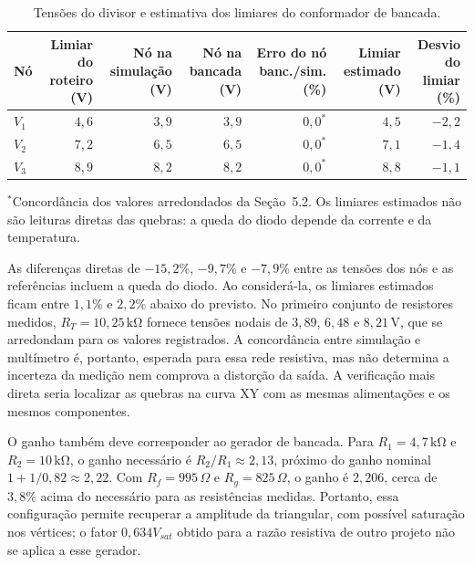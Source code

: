 \documentclass[11pt,a4paper]{article}
\begin{document}
\begin{table}[H]
\centering
\caption{Tensões do divisor e estimativa dos limiares do conformador de bancada.}
\label{tab:disc-tensoes-bancada}
\small
\begin{tabular}{@{}lrrrrrr@{}}
\toprule
Nó & \shortstack{Limiar do\\roteiro (V)}
& \shortstack{Nó na\\simulação (V)}
& \shortstack{Nó na\\bancada (V)}
& \shortstack{Erro do nó\\banc./sim. (\%)}
& \shortstack{Limiar\\estimado (V)}
& \shortstack{Desvio do\\limiar (\%)}\\
\midrule
$V_1$ & $4{,}6$ & $3{,}9$ & $3{,}9$ & $0{,}0^{*}$ & $4{,}5$ & $-2{,}2$\\
$V_2$ & $7{,}2$ & $6{,}5$ & $6{,}5$ & $0{,}0^{*}$ & $7{,}1$ & $-1{,}4$\\
$V_3$ & $8{,}9$ & $8{,}2$ & $8{,}2$ & $0{,}0^{*}$ & $8{,}8$ & $-1{,}1$\\
\bottomrule
\end{tabular}

\vspace{3pt}
\begin{minipage}{0.97\linewidth}\footnotesize
$^{*}$Concordância dos valores arredondados da Seção~5.2.
Os limiares estimados não são leituras diretas das quebras:
a queda do diodo depende da corrente e da temperatura.
\end{minipage}
\end{table}

As diferenças diretas de $-15{,}2\%$, $-9{,}7\%$ e $-7{,}9\%$
entre as tensões dos nós e as referências incluem a queda do diodo.
Ao considerá-la, os limiares estimados ficam entre $1{,}1\%$ e $2{,}2\%$
abaixo do previsto. No primeiro conjunto de resistores medidos,
$R_T=10{,}25\,\mathrm{k\Omega}$ fornece tensões nodais de
$3{,}89$, $6{,}48$ e $8{,}21\,\mathrm{V}$, que se arredondam para
os valores registrados. A concordância entre simulação e multímetro é,
portanto, esperada para essa rede resistiva, mas não determina a
incerteza da medição nem comprova a distorção da saída. A verificação mais direta seria localizar
as quebras na curva XY com as mesmas alimentações e os mesmos componentes.

O ganho também deve corresponder ao gerador de bancada. Para
$R_1=4{,}7\,\mathrm{k\Omega}$ e $R_2=10\,\mathrm{k\Omega}$,
o ganho necessário é $R_2/R_1\approx2{,}13$, próximo do ganho nominal
$1+1/0{,}82\approx2{,}22$. Com $R_f=995\,\Omega$ e $R_g=825\,\Omega$,
o ganho é $2{,}206$, cerca de $3{,}8\%$ acima do necessário para as
resistências medidas. Portanto, essa configuração permite recuperar a
amplitude da triangular, com possível saturação nos vértices;
o fator $0{,}634V_{sat}$ obtido para a razão resistiva de outro projeto
não se aplica a esse gerador.
\end{document}
